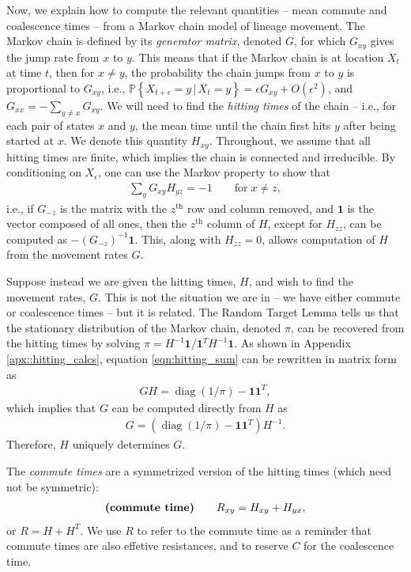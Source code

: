 \documentclass{article}
\DeclareMathOperator{\diag}{\mathop{\mbox{diag}}}
\renewcommand{\P}{\mathbb{P}}
\newcommand{\given}{\,\vert\,}
\newcommand{\PP}[1]{\P\!\left\{#1\right\}}
\newcommand{\bone}{\mathbf{1}}
\begin{document}
Now, we explain how to compute the relevant quantities --
mean commute and coalescence times -- from a Markov chain model of lineage movement.
The Markov chain is defined by its \emph{generator matrix}, denoted $G$,
for which $G_{xy}$ gives the jump rate from $x$ to $y$.
This means that if the Markov chain is at location $X_t$ at time $t$,
then for $x \neq y$, the probability the chain jumps from $x$ to $y$ is proportional to $G_{xy}$,
i.e., $\PP{X_{t+\epsilon} = y \given X_t = y} = \epsilon G_{xy} + O(\epsilon^2)$,
and $G_{xx} = - \sum_{y \neq x} G_{xy}$.
We will need to find the \emph{hitting times} of the chain --
i.e., for each pair of states $x$ and $y$, 
the mean time until the chain first hits $y$ after being started at $x$.
We denote this quantity $H_{xy}$.
Throughout, we assume that all hitting times are finite,
which implies the chain is connected and irreducible.
By conditioning on $X_\epsilon$,
one can use the Markov property to show that
\begin{align} \label{eqn:hitting_sum}
    \sum_y G_{xy} H_{yz} = -1 \qquad \text{for} \; x \neq z,
\end{align}
i.e., if $G_{-z}$ is the matrix with the $z^\text{th}$ row and column removed,
and $\bone$ is the vector composed of all ones,
then the $z^\text{th}$ column of $H$, except for $H_{zz}$,
can be computed as $- (G_{-z})^{-1} \bone$.
This, along with $H_{zz} = 0$, allows computation of $H$
from the movement rates $G$.

Suppose instead we are given the hitting times, $H$, and wish to find the movement rates, $G$.
This is not the situation we are in -- we have either commute or coalescence times --
but it is related.
The Random Target Lemma \citep{aldous}
tells us that the stationary distribution of the Markov chain, denoted $\pi$,
can be recovered from the hitting times by solving $\pi = H^{-1} \bone / \bone^T H^{-1} \bone$.
As shown in Appendix \ref{apx::hitting_calcs},
equation \eqref{eqn:hitting_sum} can be rewritten in matrix form as
\begin{align}
    G H = \diag(1/\pi) - \bone \bone^T ,
\end{align}
which implies that $G$ can be computed directly from $H$ as
\begin{align} \label{eqn:G_from_H}
    G = \left( \diag(1/\pi) - \bone \bone^T \right) H^{-1} .
\end{align}
Therefore, $H$ uniquely determines $G$.

The \emph{commute times} are a symmetrized version of the hitting times
(which need not be symmetric):
\begin{align} \label{eqn:R_from_H}
\text{\bf (commute time)} \qquad
    R_{xy} = H_{xy} + H_{yx},
\end{align}
or $R = H + H^T$.
We use $R$ to refer to the commute time as a reminder that commute times are also effetive resistances,
and to reserve $C$ for the coalescence time.
\end{document}
